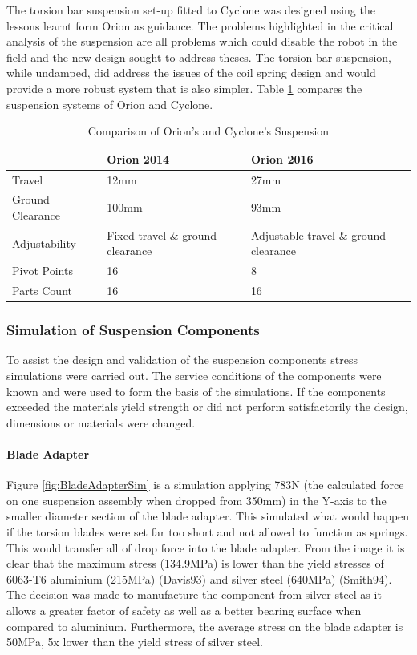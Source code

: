 The torsion bar suspension set-up fitted to Cyclone was designed using the lessons learnt form Orion as guidance. The problems highlighted in the critical analysis of the suspension are all problems which could disable the robot in the field and the new design sought to address theses. The torsion bar suspension, while undamped, did address the issues of the coil spring design and would provide a more robust system that is also simpler. Table \ref{fig:SusComp} compares the suspension systems of Orion and Cyclone.

\begin{table}[h]
\centering
\begin{tabular}{l l l}
\hline
\textbf{} & \textbf{Orion 2014} & \textbf{Orion 2016}\\
\hline
Travel & 12mm & 27mm\\
Ground Clearance & 100mm & 93mm \\
Adjustability & Fixed travel \& ground clearance&  Adjustable travel \& ground clearance\\
Pivot Points & 16 & 8\\
Parts Count & 16 & 16\\
\hline
\end{tabular}
\caption{Comparison of Orion's and Cyclone's Suspension}
\label{fig:SusComp}
\end{table}

\subsubsection{Simulation of Suspension Components}

To assist the design and validation of the suspension components stress simulations were carried out. The service conditions of the components were known and were used to form the basis of the simulations. If the components exceeded the materials yield strength or did not perform satisfactorily the design, dimensions or materials were changed.

\paragraph{Blade Adapter}

Figure \ref{fig:BladeAdapterSim} is a simulation applying 783N (the calculated force on one suspension assembly when dropped from 350mm) in the Y-axis to the smaller diameter section of the blade adapter. This simulated what would happen if the torsion blades were set far too short and not allowed to function as springs. This would transfer all of drop force into the blade adapter. From the image it is clear that the maximum stress (134.9MPa) is lower than the yield stresses of 6063-T6 aluminium (215MPa) (Davis93) and silver steel (640MPa) (Smith94). The decision was made to manufacture the component from silver steel as it allows a greater factor of safety as well as a better bearing surface when compared to aluminium. Furthermore, the average stress on the blade adapter is 50MPa, 5x lower than the yield stress of silver steel.

